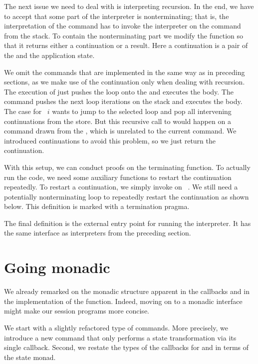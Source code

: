 \documentclass[acmsmall,review,anonymous,screen]{acmart}
\begin{document}
The next issue we need to deal with is interpreting recursion. In the
end, we have to accept that some part of the interpreter is
nonterminating; that is, the interpretation of the {\ACONTINUE}
command has to invoke the interpreter on the {\AMU} command from the
stack. To contain the nonterminating part we modify the {\Aexecutor} function so
that it returns either a continuation or a result. Here a continuation
is a pair of the {\ACommandStack} and the application state.
\rstAlternative

We omit the commands that are implemented in the same way as in
preceding sections, as we make use of the continuation only when dealing with recursion. 
The execution of {\AMU} just pushes the loop onto the
{\ACommandStack} and executes the body.
The {\AUNROLL} command pushes the next loop iterations on the stack
and executes the body.
The case for {\ACONTINUE~$i$} wants to jump to the selected loop and pop
all intervening continuations from the store. But this recursive
call to {\Aexecutor} would happen on a command drawn from the
{\ACommandStack}, which is unrelated to the current command.
We introduced continuations to avoid this problem, so we just return
the continuation.

With this setup, we can conduct proofs on the terminating {\Aexecutor}
function. To actually run the code, we need some auxiliary functions
to restart the continuation repeatedly.
To restart a continuation, we simply invoke
{\Aexecutor} on ~\Azero. 
\rstAlternativeExecutorRestart
We still need a potentially nonterminating loop to repeatedly restart the
continuation as shown below. This definition is marked with a
termination pragma.
\rstAlternativeExecutorHSRestart

The final definition is the external entry point for running the
interpreter. It has the same interface as interpreters from the
preceding section.

\section{Going monadic}
\label{sec:going-monadic}


We already remarked on the monadic structure apparent in the
callbacks and in the implementation of the {\Aexecutor}
function. Indeed, moving on to a monadic interface might make our session
programs more concise.

We start with a slightly refactored type of commands. More precisely,
we introduce a new {\ACSKIP} command that only performs a state 
transformation via its single callback.
Second, we restate the types of the callbacks for {\ACSEND} and
{\ACRECV} in terms of the state monad.
\end{document}
